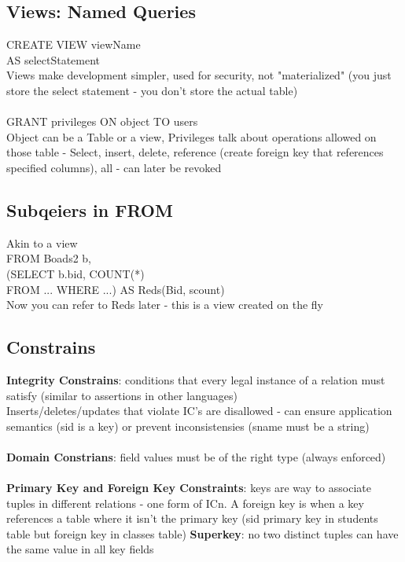\documentclass{article}
\begin{document}
\subsection{Views: Named Queries}
CREATE VIEW viewName \\ AS selectStatement \\ 
Views make development simpler, used for security, not "materialized" (you just store the select statement - you don't store the actual table) \\  \\
GRANT privileges ON object TO users \\ 
Object can be a Table or a view, Privileges talk about operations allowed on those table - Select, insert, delete, reference (create foreign key that references specified columns), all - can later be revoked

\subsection{Subqeiers in FROM}
Akin to a view \\ 
FROM Boads2 b, \\
(SELECT b.bid, COUNT(*) \\
FROM ... WHERE ...) AS Reds(Bid, scount) \\ 
Now you can refer to Reds later - this is a view created on the fly

\subsection{Constrains}
\textbf{Integrity Constrains}: conditions that every legal instance of a relation must satisfy (similar to assertions in other languages) \\
Inserts/deletes/updates that violate IC's are disallowed - can ensure application semantics (sid is a key) or prevent inconsistensies (sname must be a string) \\ \\
\textbf{Domain Constrians}: field values must be of the right type (always enforced) \\ \\
\textbf{Primary Key and Foreign Key Constraints}: keys are way to associate tuples in different relations - one form of ICn. A foreign key is when a key references a table where it isn't the primary key (sid primary key in students table but foreign key in classes table)
\textbf{Superkey}: no two distinct tuples can have the same value in all key fields
\end{document}
